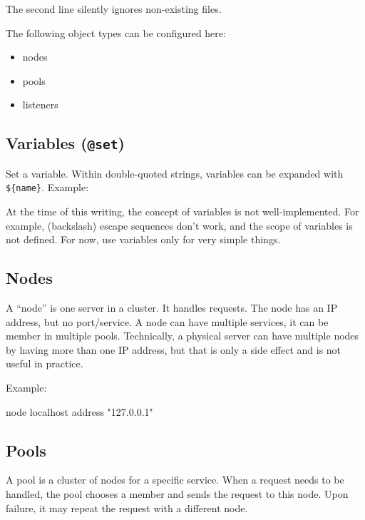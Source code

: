 \documentclass[a4paper,12pt]{article}
\begin{document}
The second line silently ignores non-existing files.

The following object types can be configured here:

\begin{itemize}
\item nodes
\item pools
\item listeners
\end{itemize}

\subsection{Variables (\texttt{@set})}

Set a variable.  Within double-quoted strings, variables can be
expanded with \verb|${name}|.  Example:


At the time of this writing, the concept of variables is not
well-implemented.  For example, (backslash) escape sequences don't
work, and the scope of variables is not defined.  For now, use
variables only for very simple things.

\subsection{Nodes}

A ``node'' is one server in a cluster.  It handles requests.  The node
has an IP address, but no port/service.  A node can have multiple
services, it can be member in multiple pools.  Technically, a physical
server can have multiple nodes by having more than one IP address, but
that is only a side effect and is not useful in practice.

Example:

\begin{verbatim*}
node localhost {
  address "127.0.0.1"
}
\end{verbatim*}

\subsection{Pools}

A pool is a cluster of nodes for a specific service.  When a request
needs to be handled, the pool chooses a member and sends the request
to this node.  Upon failure, it may repeat the request with a
different node.
\end{document}
